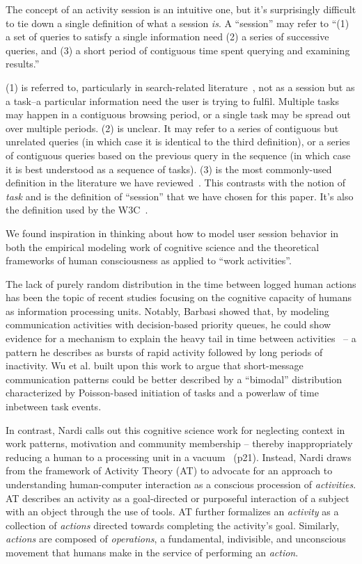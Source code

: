 The concept of an activity session is an intuitive one, but it's surprisingly difficult to tie down a single definition of what a session \emph{is}.  A ``session'' may refer to ``(1) a set of queries to satisfy a single information need (2) a series of successive queries, and (3) a short period of contiguous time spent querying and examining results.''~\cite{jones2008beyond}

(1) is referred to, particularly in search-related literature~\cite{eickhoff2014lessons,jones2008beyond}, not as a session but as a task--a particular information need the user is trying to fulfil.  Multiple tasks may happen in a contiguous browsing period, or a single task may be spread out over multiple periods.
(2) is unclear. It may refer to a series of contiguous but unrelated queries (in which case it is identical to the third definition), or a series of contiguous queries based on the previous query in the sequence (in which case it is best understood as a sequence of tasks).
(3) is the most commonly-used definition in the literature we have reviewed~\cite{govseva2006empirical,nadjarbashi2004improving,spiliopoulou2003framework,white2010assessing}. This contrasts with the notion of \emph{task} and is the definition of ``session'' that we have chosen for this paper. It's also the definition used by the W3C~\cite{W3C1999}.

We found inspiration in thinking about how to model user session behavior in both the empirical modeling work of cognitive science and the theoretical frameworks of human consciousness as applied to ``work activities''.
 
The lack of purely random distribution in the time between logged human actions has been the topic of recent studies focusing on the cognitive capacity of humans as information processing units.  Notably, Barbasi showed that, by modeling communication activities with decision-based priority queues, he could show evidence for a mechanism to explain the heavy tail in time between activities~\cite{barabasi2005origin} -- a pattern he describes as bursts of rapid activity followed by long periods of inactivity.  Wu et al. built upon this work to argue that short-message communication patterns could be better described by a ``bimodal'' distribution characterized by Poisson-based initiation of tasks and a powerlaw of time inbetween task events\cite{wu2010evidence}.

In contrast, Nardi calls out this cognitive science work for neglecting context in work patterns, motivation and community membership -- thereby inappropriately reducing a human to a processing unit in a vacuum~\cite{nardi1996context} (p21).  Instead, Nardi draws from the framework of Activity Theory (AT) to advocate for an approach to understanding human-computer interaction as a conscious procession of \emph{activities}.  AT describes an activity as a goal-directed or purposeful interaction of a subject with an object through the use of tools. AT further formalizes an \emph{activity} as a collection of \emph{actions} directed towards completing the activity's goal.  Similarly, \emph{actions} are composed of \emph{operations}, a fundamental, indivisible, and unconscious movement that humans make in the service of performing an \emph{action}.

